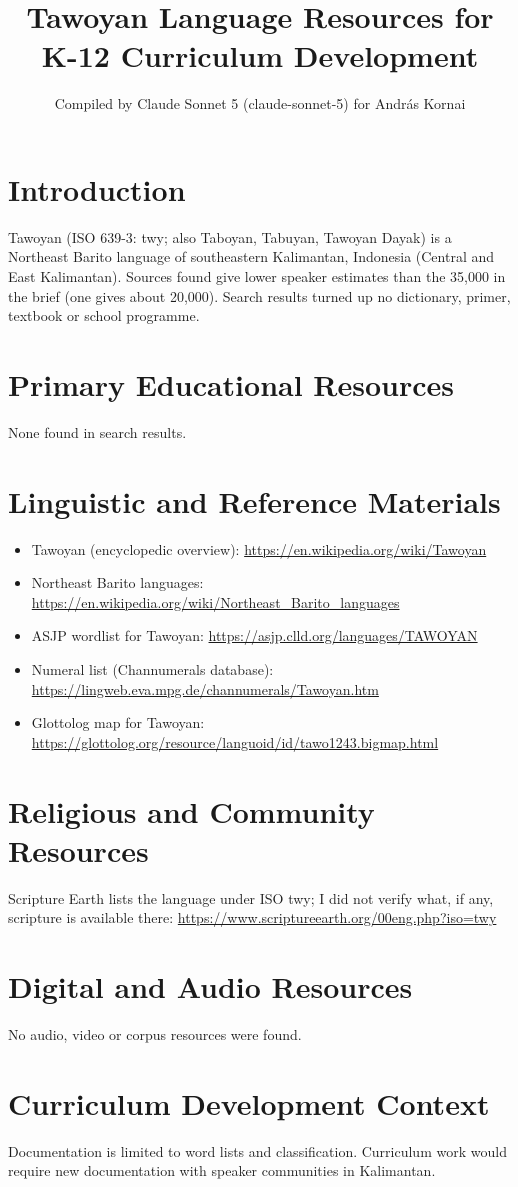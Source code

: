 \documentclass[12pt]{article}
\title{Tawoyan Language Resources for K-12 Curriculum Development}
\author{Compiled by Claude Sonnet 5 (claude-sonnet-5) for Andr\'as Kornai}
\date{}
\begin{document}
\maketitle

\section{Introduction}
Tawoyan (ISO 639-3: twy; also Taboyan, Tabuyan, Tawoyan Dayak) is a Northeast Barito language of southeastern Kalimantan, Indonesia (Central and East Kalimantan). Sources found give lower speaker estimates than the 35,000 in the brief (one gives about 20,000). Search results turned up no dictionary, primer, textbook or school programme.

\section{Primary Educational Resources}
None found in search results.

\section{Linguistic and Reference Materials}
\begin{itemize}
\item Tawoyan (encyclopedic overview): \url{https://en.wikipedia.org/wiki/Tawoyan}
\item Northeast Barito languages: \url{https://en.wikipedia.org/wiki/Northeast_Barito_languages}
\item ASJP wordlist for Tawoyan: \url{https://asjp.clld.org/languages/TAWOYAN}
\item Numeral list (Channumerals database): \url{https://lingweb.eva.mpg.de/channumerals/Tawoyan.htm}
\item Glottolog map for Tawoyan: \url{https://glottolog.org/resource/languoid/id/tawo1243.bigmap.html}
\end{itemize}

\section{Religious and Community Resources}
Scripture Earth lists the language under ISO twy; I did not verify what, if any, scripture is available there: \url{https://www.scriptureearth.org/00eng.php?iso=twy}

\section{Digital and Audio Resources}
No audio, video or corpus resources were found.

\section{Curriculum Development Context}
Documentation is limited to word lists and classification. Curriculum work would require new documentation with speaker communities in Kalimantan.
\end{document}
